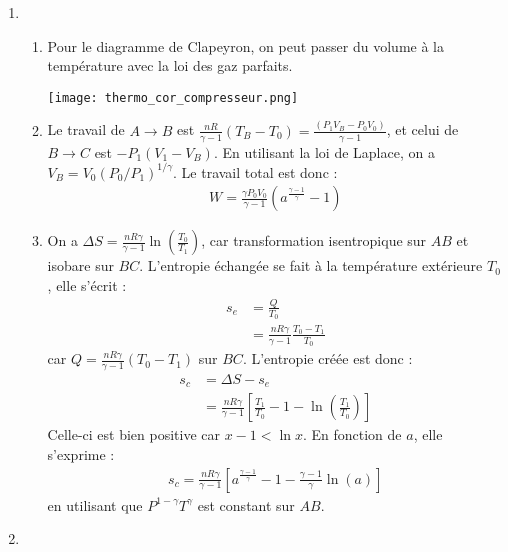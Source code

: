 \begin{correction}

\begin{enumerate}

\item

\begin{enumerate}

\item Pour le diagramme de Clapeyron, on peut passer du volume à la température avec la loi des gaz parfaits.

\centering
\texttt{[image: thermo\_cor\_compresseur.png]}


\item Le travail de $A\rightarrow B$ est $\frac{nR}{\gamma-1}(T_B-T_0)=\frac{(P_1V_B-P_0V_0)}{\gamma-1}$, et celui de $B\rightarrow C$ est $-P_1(V_1-V_B)$. En utilisant la loi de Laplace, on a $V_B=V_0(P_0/P_1)^{1/\gamma}$. Le travail total est donc :
\begin{align*}
	W=\frac{\gamma P_0V_0}{\gamma-1}\left(a^{\frac{\gamma-1}{\gamma}}-1 \right) 
\end{align*}

\item On a $\Delta S=\frac{nR\gamma}{\gamma-1}\ln\left( \frac{T_0}{T_1}\right)$, car transformation isentropique sur $AB$ et isobare sur $BC$. L'entropie échangée se fait à la température extérieure $T_0$, elle s'écrit :
\begin{align*}
	s_e &= \frac{Q}{T_0} \\
	&=\frac{nR\gamma}{\gamma-1}\frac{T_0-T_1}{T_0}
\end{align*}
car $Q=\frac{nR\gamma}{\gamma-1}(T_0-T_1)$ sur $BC$. 
L'entropie créée est donc :
\begin{align*}
	s_c & = \Delta S - s_e \\
	&=\frac{nR\gamma}{\gamma-1}\left[\frac{T_1}{T_0}-1-\ln\left( \frac{T_1}{T_0} \right) \right] 
\end{align*}
Celle-ci est bien positive car $x-1<\ln x$. En fonction de $a$, elle s'exprime :
\begin{align*}
	s_c =\frac{nR\gamma}{\gamma-1}\left[a^\frac{\gamma-1}{\gamma}-1-\frac{\gamma-1}{\gamma}\ln\left( a \right) \right] 
\end{align*}
en utilisant que $P^{1-\gamma}T^\gamma$ est constant sur $AB$.

\end{enumerate}

\item 


\end{enumerate}
\end{correction}
